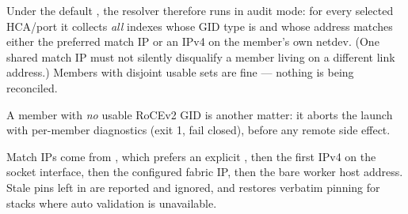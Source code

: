 Under the default , the resolver therefore
runs in audit mode: for every selected HCA/port it collects \emph{all}
indexes whose GID type is  and whose address matches either
the preferred match IP or an IPv4 on the member's own netdev. (One shared
match IP must not silently disqualify a member living on a different link
address.) Members with disjoint usable sets are fine --- nothing is being
reconciled.

A member with \emph{no} usable RoCEv2 GID is another matter: it aborts the
launch with per-member diagnostics (exit 1, fail closed), before any remote
side effect.

Match IPs come from , which prefers an explicit
, then the first IPv4 on the socket interface,
then the configured fabric IP, then the bare worker host address. Stale
 pins left in  are reported
and ignored, and  restores verbatim
pinning for stacks where auto validation is unavailable.

